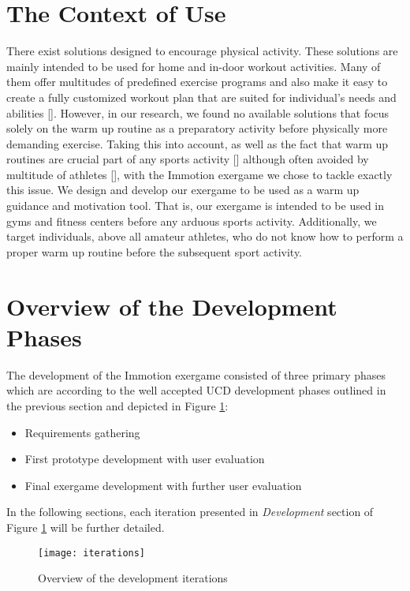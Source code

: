 \section{The Context of Use}
There exist solutions designed to encourage physical activity. These solutions are mainly intended to be used for home and in-door workout activities. Many of them offer multitudes of predefined exercise programs and also make it easy to create a fully customized workout plan that are suited for individual's needs and abilities []. However, in our research, we found no available solutions that focus solely on the warm up routine as a preparatory activity before physically more demanding exercise. Taking this into account, as well as the fact that warm up routines are crucial part of any sports activity [] although often avoided by multitude of athletes [], with the Immotion exergame we chose to tackle exactly this issue. We design and develop our exergame to be used as a warm up guidance and motivation tool. That is, our exergame is intended to be used in gyms and fitness centers before any arduous sports activity. Additionally, we target individuals, above all amateur athletes, who do not know how to perform a proper warm up routine before the subsequent sport activity. \pagebreak
\section{Overview of the Development Phases}
The development of the Immotion exergame consisted of three primary phases which are according to the well accepted UCD development phases outlined in the previous section and depicted in Figure \ref{fig:iterations}: 
\begin{itemize}
\item Requirements gathering 
\item First prototype development with user evaluation
\item Final exergame development with further user evaluation
\end{itemize}
In the following sections, each iteration presented in \textit{Development} section of Figure \ref{fig:iterations} will be further detailed. 
\begin{figure}[h]
    \centering
    \texttt{[image: iterations]}
    \caption{Overview of the development iterations}
    \label{fig:iterations}
\end{figure}
